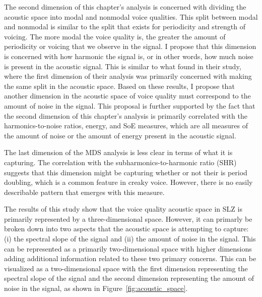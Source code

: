 The second dimension of this chapter's analysis is concerned with dividing the acoustic space into modal and nonmodal voice qualities. This split between modal and nonmodal is similar to the split that exists for periodicity and strength of voicing. The more modal the voice quality is, the greater the amount of periodicity or voicing that we observe in the signal. I propose that this dimension is concerned with how harmonic the signal is, or in other words, how much noise is present in the acoustic signal. This is similar to what \citet{keatingCrosslanguageAcousticSpace2023} found in their study, where the first dimension of their analysis was primarily concerned with making the same split in the acoustic space. Based on these results, I propose that another dimension in the acoustic space of voice quality must correspond to the amount of noise in the signal. This proposal is further supported by the fact that the second dimension of this chapter's analysis is primarily correlated with the harmonics-to-noise ratios, energy, and SoE measures, which are all measures of the amount of noise or the amount of energy present in the acoustic signal. 

The last dimension of the MDS analysis is less clear in terms of what it is capturing. The correlation with the subharmonics-to-harmonic ratio (SHR) suggests that this dimension might be capturing whether or not their is period doubling, which is a common feature in creaky voice. However, there is no easily describable pattern that emerges with this measure. 

The results of this study show that the voice quality acoustic space in SLZ is primarily represented by a three-dimensional space. However, it can primarly be broken down into two aspects that the acoustic space is attempting to capture: (i) the spectral slope of the signal and (ii) the amount of noise in the signal. This can be represented as a primarily two-dimensional space with higher dimensions adding additional information related to these two primary concerns. This can be visualized as a two-dimensional space with the first dimension representing the spectral slope of the signal and the second dimension representing the amount of noise in the signal, as shown in Figure~\ref{fig:acoustic_space}.

